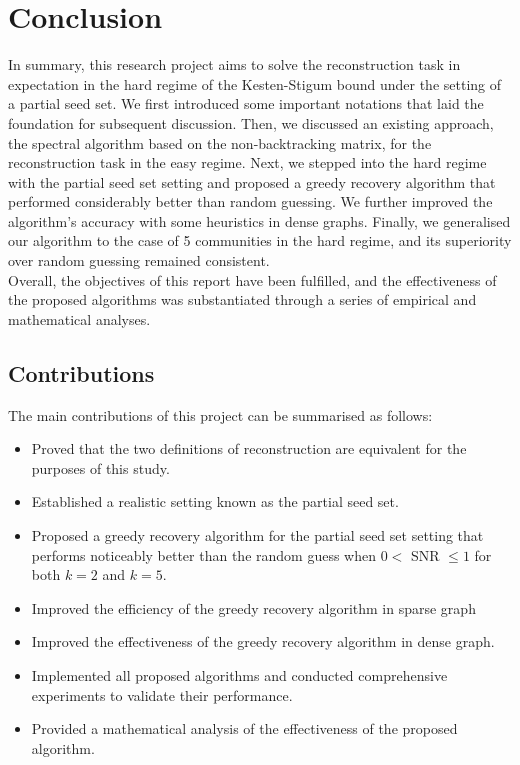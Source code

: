 \chapter{Conclusion}\label{chapter 6}
In summary, this research project aims to solve the reconstruction task in expectation in the hard regime of the Kesten-Stigum bound under the setting of a partial seed set. We first introduced some important notations that laid the foundation for subsequent discussion. Then, we discussed an existing approach, the spectral algorithm based on the non-backtracking matrix, for the reconstruction task in the easy regime. Next, we stepped into the hard regime with the partial seed set setting and proposed a greedy recovery algorithm that performed considerably better than random guessing. We further improved the algorithm's accuracy with some heuristics in dense graphs. Finally, we generalised our algorithm to the case of 5 communities in the hard regime, and its superiority over random guessing remained consistent.\\
Overall, the objectives of this report have been fulfilled, and the effectiveness of the proposed algorithms was substantiated through a series of empirical and mathematical analyses.
\section{Contributions}
The main contributions of this project can be summarised as follows:
\begin{itemize}
    \item Proved that the two definitions of reconstruction are equivalent for the purposes of this study.
    \item Established a realistic setting known as the partial seed set.
    \item Proposed a greedy recovery algorithm for the partial seed set setting that performs noticeably better than the random guess when $0<$ SNR $\leq1$ for both $k=2$ and $k=5$.
    \item Improved the efficiency of the greedy recovery algorithm in sparse graph
    \item Improved the effectiveness of the greedy recovery algorithm in dense graph.
    \item  Implemented all proposed algorithms and conducted comprehensive experiments to validate their performance.
    \item Provided a mathematical analysis of the effectiveness of the proposed algorithm.
\end{itemize}
